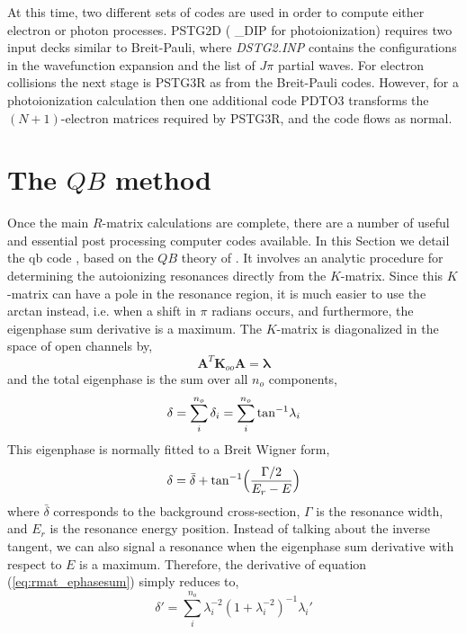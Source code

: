At this time, two different sets of codes are used in order to compute either electron or photon processes. PSTG2D ( \_DIP for photoionization) requires two input decks similar to Breit-Pauli, where \textit{DSTG2.INP} contains the configurations in the wavefunction expansion and the list of $J\pi$ partial waves. For electron collisions the next stage is PSTG3R as from the Breit-Pauli codes. However, for a photoionization calculation then one additional code PDTO3 transforms the $(N+1)$-electron matrices required by PSTG3R, and the code flows as normal.

\section{The $QB$ method}\label{sec:rmat_qb}
Once the main $R$-matrix calculations are complete, there are a number of useful and essential post processing computer codes available. In this Section we detail the {\sc qb} code \citep{1998CoPhC.114..225Q}, based on the $QB$ theory of \citet{1996JPhB...29.4529Q}. It involves an analytic procedure for determining the autoionizing resonances directly from the $K$-matrix. Since this $K$-matrix can have a pole in the resonance region, it is much easier to use the arctan instead, i.e. when a shift in $\pi$ radians occurs, and furthermore, the eigenphase sum derivative is a maximum. The $K$-matrix is diagonalized in the space of open channels by,
\begin{equation}\label{eq:rmat_koo}
\boldsymbol{A}^T\boldsymbol{K}_{oo}\boldsymbol{A} = \boldsymbol{\lambda}
\end{equation}
and the total eigenphase is the sum over all $n_o$ components,
\begin{equation}\label{eq:rmat_ephasesum}
\delta = \sum_i^{n_o}\delta_i = \sum_i^{n_o}{\rm tan}^{-1}\lambda_i
\end{equation}
This eigenphase is normally fitted to a Breit Wigner form,
\begin{equation}\label{eq:rmat_breitwigner}
\delta = \bar{\delta}+{\rm tan}^{-1}\Big(\frac{\Gamma/2}{E_r-E}\Big)
\end{equation}
where $\bar{\delta}$ corresponds to the background cross-section, $\Gamma$ is the resonance width, and $E_r$ is the resonance energy position. Instead of talking about the inverse tangent, we can also signal a resonance when the eigenphase sum derivative with respect to $E$ is a maximum. Therefore, the derivative of equation (\ref{eq:rmat_ephasesum}) simply reduces to,
\begin{equation}\label{eq:rmat_deltaprime}
\delta' = \sum_i^{n_o}\lambda_i^{-2}(1+\lambda_i^{-2})^{-1}\lambda_i'
\end{equation}
